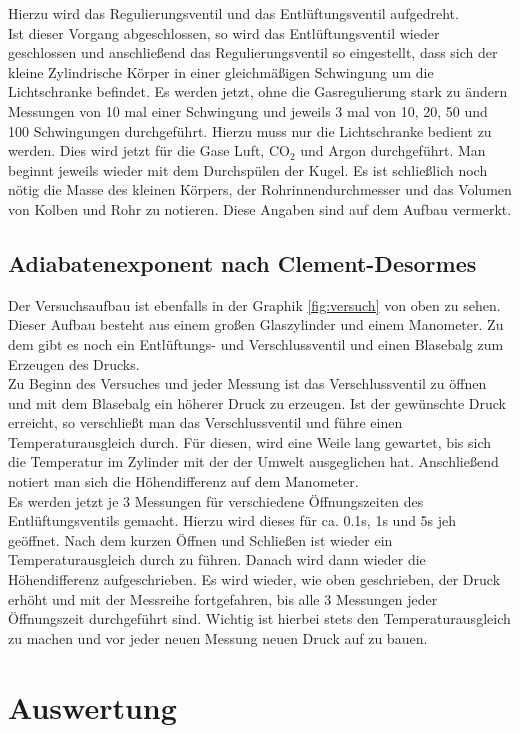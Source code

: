 \documentclass[12pt,a4paper,titlepage,headinclude,bibtotoc]{scrartcl}
\begin{document}
Hierzu wird das Regulierungsventil und das Entlüftungsventil aufgedreht.\\
Ist dieser Vorgang abgeschlossen, so wird das Entlüftungsventil wieder geschlossen und anschließend das Regulierungsventil so eingestellt, dass sich der kleine Zylindrische Körper in einer gleichmäßigen Schwingung um die Lichtschranke befindet.
Es werden jetzt, ohne die Gasregulierung stark zu ändern Messungen von 10 mal einer Schwingung und jeweils 3 mal von 10, 20, 50 und 100 Schwingungen durchgeführt.
Hierzu muss nur die Lichtschranke bedient zu werden.
Dies wird jetzt für die Gase Luft, CO$_2$ und Argon durchgeführt.
Man beginnt jeweils wieder mit dem Durchspülen der Kugel.
Es ist schließlich noch nötig die Masse des kleinen Körpers, der Rohrinnendurchmesser und das Volumen von Kolben und Rohr zu notieren.
Diese Angaben sind auf dem Aufbau vermerkt.

\subsection{Adiabatenexponent nach Clement-Desormes}
\label{sec:clem}
Der Versuchsaufbau ist ebenfalls in der Graphik \ref{fig:versuch} von oben zu sehen.
Dieser Aufbau besteht aus einem großen Glaszylinder und einem Manometer.
Zu dem gibt es noch ein Entlüftungs- und Verschlussventil und einen Blasebalg zum Erzeugen des Drucks.\\
Zu Beginn des Versuches und jeder Messung ist das Verschlussventil zu öffnen und mit dem Blasebalg ein höherer Druck zu erzeugen.
Ist der gewünschte Druck erreicht, so verschließt man das Verschlussventil und führe einen Temperaturausgleich durch.
Für diesen, wird eine Weile lang gewartet, bis sich die Temperatur im Zylinder mit der der Umwelt ausgeglichen hat.
Anschließend notiert man sich die Höhendifferenz auf dem Manometer.\\
Es werden jetzt je 3 Messungen für verschiedene Öffnungszeiten des Entlüftungsventils gemacht.
Hierzu wird dieses für ca. 0.1s, 1s und 5s jeh geöffnet.
Nach dem kurzen Öffnen und Schließen ist wieder ein Temperaturausgleich durch zu führen.
Danach wird dann wieder die Höhendifferenz aufgeschrieben.
Es wird wieder, wie oben geschrieben, der Druck erhöht und mit der Messreihe fortgefahren, bis alle 3 Messungen jeder Öffnungszeit durchgeführt sind.
Wichtig ist hierbei stets den Temperaturausgleich zu machen und vor jeder neuen Messung neuen Druck auf zu bauen.

\section{Auswertung}
\label{sec:auswertung}
\end{document}

